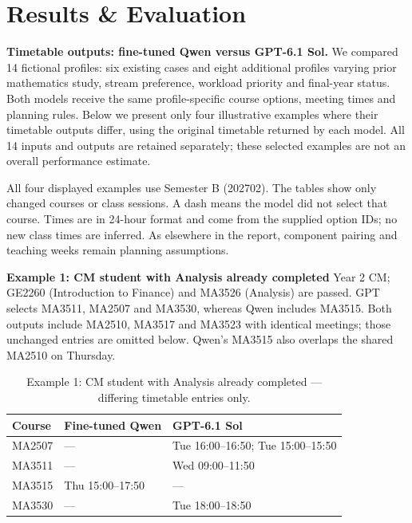 \documentclass{article}
\begin{document}
\newpage
\section{Results \& Evaluation}

\textbf{Timetable outputs: fine-tuned Qwen versus GPT-6.1 Sol.} We compared 14 fictional profiles: six existing cases and eight additional profiles varying prior mathematics study, stream preference, workload priority and final-year status. Both models receive the same profile-specific course options, meeting times and planning rules. Below we present only four illustrative examples where their timetable outputs differ, using the original timetable returned by each model. All 14 inputs and outputs are retained separately; these selected examples are not an overall performance estimate.

All four displayed examples use Semester B (202702). The tables show only changed courses or class sessions. A dash means the model did not select that course. Times are in 24-hour format and come from the supplied option IDs; no new class times are inferred. As elsewhere in the report, component pairing and teaching weeks remain planning assumptions.

\textbf{Example 1: CM student with Analysis already completed} Year 2 CM; GE2260 (Introduction to Finance) and MA3526 (Analysis) are passed. GPT selects MA3511, MA2507 and MA3530, whereas Qwen includes MA3515. Both outputs include MA2510, MA3517 and MA3523 with identical meetings; those unchanged entries are omitted below. Qwen's MA3515 also overlaps the shared MA2510 on Thursday.

\begin{table}[H]
\centering\small
\caption{Example 1: CM student with Analysis already completed --- differing timetable entries only.}
\begin{tabular}{p{.6in}p{2.2in}p{2.2in}}
\toprule
Course & Fine-tuned Qwen & GPT-6.1 Sol\\
\midrule
{\raggedright MA2507\par} & {\raggedright ---\par} & {\raggedright Tue 16:00--16:50; Tue 15:00--15:50\par}\\
{\raggedright MA3511\par} & {\raggedright ---\par} & {\raggedright Wed 09:00--11:50\par}\\
{\raggedright MA3515\par} & {\raggedright Thu 15:00--17:50\par} & {\raggedright ---\par}\\
{\raggedright MA3530\par} & {\raggedright ---\par} & {\raggedright Tue 18:00--18:50\par}\\
\bottomrule
\end{tabular}
\label{tab:comparison04-1}
\end{table}
\end{document}
